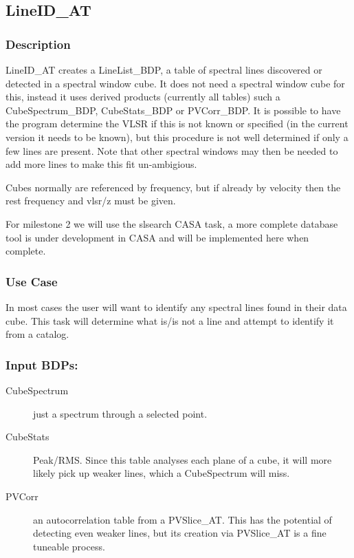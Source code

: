 
\subsection{LineID\_AT}

\subsubsection{Description}

LineID\_AT creates a LineList\_BDP, a table of spectral lines discovered or
detected in a spectral window cube. 
It does not need a spectral window cube for this, instead it
uses derived products (currently all tables) such a 
CubeSpectrum\_BDP, CubeStats\_BDP or PVCorr\_BDP.  It is possible
to have the program determine the VLSR if this is not known or specified
(in the current version it needs to be known), but this procedure
is not well determined if only a few lines are present.  Note that
other spectral windows may then be needed to add more lines to make this
fit un-ambigious.

Cubes normally are referenced by frequency, but if already by velocity then the rest frequency and vlsr/z must be given.

For milestone 2 we will use the slsearch CASA task, a more complete database tool is under
development in CASA and will be implemented here when complete.

\subsubsection{Use Case}
In most cases the user will want to identify any spectral lines found in their data cube. This task
will determine what is/is not a line and attempt to identify it from a catalog.

\subsubsection{Input BDPs:}


\begin{description}
\item[CubeSpectrum] just a spectrum through a selected point.
\item[CubeStats] Peak/RMS. Since this table analyses each plane of a cube, it will more likely pick 
up weaker lines, which a CubeSpectrum will miss.
\item[PVCorr] an autocorrelation table from a PVSlice\_AT. This has the potential of detecting even
weaker lines, but its creation via PVSlice\_AT is a fine tuneable process.
\end{description}


